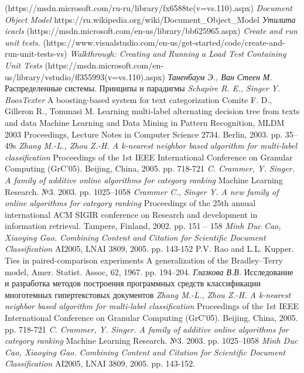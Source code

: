 \documentclass[russian, utf8, emptystyle]{eskdtext}
\begin{document}
\begin{thebibliography}{50}
	{(https://msdn.microsoft.com/ru-ru/library/fx6588te(v=vs.110).aspx)}
	\textit{Document Object Model}
	{https://ru.wikipedia.org/wiki/Document\_Object\_Model}
	\textit{Утилита icacls}
	{(https://msdn.microsoft.com/en-us/library/bb625965.aspx)}
	\textit{Create and run unit tests.}
	{(https://www.visualstudio.com/en-us/get-started/code/create-and-run-unit-tests-vs)}
	\textit{Walkthrough: Creating and Running a Load Test Containing Unit Tests}
	{(https://msdn.microsoft.com/en-us/library/vstudio/ff355993(v=vs.110).aspx)}
	\textit{Таненбаум Э., Ван Стеен М.}
	{Распределенные системы. Принципы и парадигмы}
	\textit{Schapire R. E., Singer Y. BoosTexter}
	{A boosting-based system for text categorization}
	{Comite F. D., Gilleron R., Tommasi M. Learning multi-label alternating decision tree from texts and data}
	{Machine Learning and Data Mining in Pattern Recognition, MLDM 2003 Proceedings, Lecture Notes in Computer Science 2734. Berlin, 2003. pp. 35–49s}
	\textit{Zhang M.-L., Zhou Z.-H. A k-nearest neighbor based algorithm for multi-label classification }
	{Proceedings of the 1st IEEE International Conference on Granular Computing (GrC'05). Beijing, China, 2005. pp. 718-721}
	\textit{C. Crammer, Y. Singer. A family of additive online algorithms for category ranking}
	{Machine Learning Research. №3. 2003. pp. 1025–1058}
	\textit{Crammer C., Singer Y. A new family of online algorithms for category ranking }
	{Proceedings of the 25th annual international ACM SIGIR conference on Research and development in information retrieval. Tampere, Finland, 2002. pp. 151 – 158}
	\textit{Minh Duc Cao, Xiaoying Gao. Combining Content and Citation for Scientific Document Classification}
	{AI2005, LNAI 3809, 2005. pp. 143-152}
	{P.V. Rao and L.L. Kupper. Ties in paired-comparison experiments}
	{A generalization of the Bradley–Terry model, Amer. Statist. Assoc, 62, 1967. pp. 194–204.}
	\textit{Глазкова В.В.}
	{Исследование и разработка методов построения программных средств классификации многотемных гипертекстовых документов}
	\textit{Zhang M.-L., Zhou Z.-H. A k-nearest neighbor based algorithm for multi-label classification }
	{Proceedings of the 1st IEEE International Conference on Granular Computing (GrC'05). Beijing, China, 2005. pp. 718-721}
	\textit{C. Crammer, Y. Singer. A family of additive online algorithms for category ranking}
	{Machine Learning Research. №3. 2003. pp. 1025–1058}
	\textit{Minh Duc Cao, Xiaoying Gao. Combining Content and Citation for Scientific Document Classification}
	{AI2005, LNAI 3809, 2005. pp. 143-152.}
\end{thebibliography}
\end{document}

